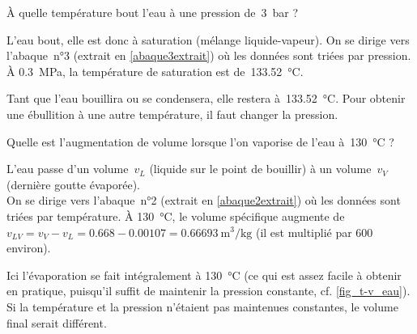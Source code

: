 			\begin{anexample}
			
			À quelle température bout l’eau à une pression de~\SI{3}{\bar} ?
			
				\begin{answer}
				L’eau bout, elle est donc à saturation (mélange liquide-vapeur). On se dirige vers l’abaque~n°3 (extrait en \cref{abaque3extrait}) où les données sont triées par pression. À \SI{0,3}{\mega\pascal}, la température de saturation est de~\SI{133,52}{\degreeCelsius}.
					\begin{remark}Tant que l’eau bouillira ou se condensera, elle restera à~\SI{133,52}{\degreeCelsius}. Pour obtenir une ébullition à une autre température, il faut changer la pression.\end{remark}\end{answer}
			\end{anexample}


			\begin{anexample}
			
			Quelle est l’augmentation de volume lorsque l’on vaporise de l’eau à~\SI{130}{\degreeCelsius} ?
			
				\begin{answer}
				L’eau passe d’un volume~$v_L$ (liquide sur le point de bouillir) à un volume~$v_V$ (dernière goutte évaporée).\\
				On se dirige vers l’abaque~n°2 (extrait en \cref{abaque2extrait}) où les données sont triées par température. À \SI{130}{\degreeCelsius}, le volume spécifique augmente de $v_{LV} = v_V - v_L = \num{0,668} - \num{0,00107} = \SI{0,66693}{\metre\cubed\per\kilogram}$ (il est multiplié par \num{600} environ).
				\begin{remark}Ici l’évaporation se fait intégralement à \SI{130}{\degreeCelsius} (ce qui est assez facile à obtenir en pratique, puisqu’il suffit de maintenir la pression constante, cf. \cref{fig_t-v_eau}). Si la température et la pression n’étaient pas maintenues constantes, le volume final serait différent.\end{remark}\end{answer}
			\end{anexample}

